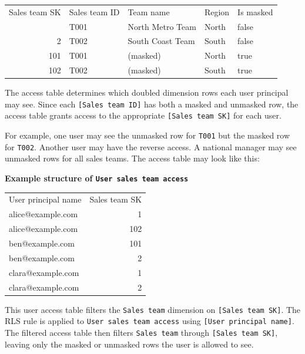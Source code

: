 \documentclass[10pt,openany,10pt]{book}
\newcounter{none}
\let\podeToprule\toprule
\let\podeMidrule\midrule
\let\podeBottomrule\bottomrule
\renewcommand{\toprule}{\arrayrulecolor{pbiGrid}\podeToprule}
\renewcommand{\midrule}{\arrayrulecolor{pbiGrid}\podeMidrule}
\renewcommand{\bottomrule}{\arrayrulecolor{pbiGrid}\podeBottomrule}
\begin{document}
{\def\LTcaptype{none} %
\begin{longtable}[]{@{}rllll@{}}
\toprule\noalign{}
Sales team SK & Sales team ID & Team name & Region & Is masked \\
\midrule\noalign{}
\endhead
\bottomrule\noalign{}
\endlastfoot
1 & T001 & North Metro Team & North & false \\
2 & T002 & South Coast Team & South & false \\
101 & T001 & (masked) & North & true \\
102 & T002 & (masked) & South & true \\
\end{longtable}
}

The access table determines which doubled dimension rows each user
principal may see. Since each \texttt{{[}Sales\ team\ ID{]}} has both a
masked and unmasked row, the access table grants access to the
appropriate \texttt{{[}Sales\ team\ SK{]}} for each user.

For example, one user may see the unmasked row for \texttt{T001} but the
masked row for \texttt{T002}. Another user may have the reverse access.
A national manager may see unmasked rows for all sales teams. The access
table may look like this:

\textbf{Example structure of
\texttt{\textquotesingle{}User\ sales\ team\ access\textquotesingle{}}}

{\def\LTcaptype{none} %
\begin{longtable}[]{@{}lr@{}}
\toprule\noalign{}
User principal name & Sales team SK \\
\midrule\noalign{}
\endhead
\bottomrule\noalign{}
\endlastfoot
alice@example.com & 1 \\
alice@example.com & 102 \\
ben@example.com & 101 \\
ben@example.com & 2 \\
clara@example.com & 1 \\
clara@example.com & 2 \\
\end{longtable}
}

This user access table filters the
\texttt{\textquotesingle{}Sales\ team\textquotesingle{}} dimension on
\texttt{{[}Sales\ team\ SK{]}}. The RLS rule is applied to
\texttt{\textquotesingle{}User\ sales\ team\ access\textquotesingle{}}
using \texttt{{[}User\ principal\ name{]}}. The filtered access table
then filters \texttt{\textquotesingle{}Sales\ team\textquotesingle{}}
through \texttt{{[}Sales\ team\ SK{]}}, leaving only the masked or
unmasked rows the user is allowed to see.
\end{document}
